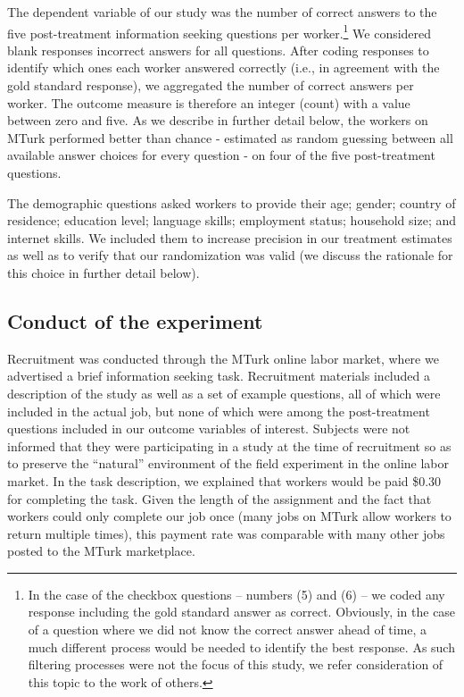 \documentclass{chi2009}
\begin{document}
{%
The dependent variable of our study was the number of correct answers
to the five post-treatment information seeking questions per
worker.\footnote{In the case of the checkbox questions -- numbers (5)
  and (6) -- we coded any response including the gold standard answer
  as correct. Obviously, in the case of a question where we did not
  know the correct answer ahead of time, a much different process
  would be needed to identify the best response. As such filtering
  processes were not the focus of this study, we refer consideration
  of this topic to the work of others.\cite{snow2008cheap}} We
considered blank responses incorrect answers for all questions. After
coding responses to identify which ones each worker answered correctly
(i.e., in agreement with the gold standard response), we aggregated
the number of correct answers per worker. The outcome measure is
therefore an integer (count) with a value between zero and five. As we
describe in further detail below, the workers on MTurk performed
better than chance - estimated as random guessing between all
available answer choices for every question - on four of the five
post-treatment questions.

The demographic questions asked workers to provide their age; gender;
country of residence; education level; language skills; employment
status; household size; and internet skills. We included them to
increase precision in our treatment estimates as well as to verify
that our randomization was valid (we discuss the rationale for this
choice in further detail below).

\subsection{Conduct of the experiment}

Recruitment was conducted through the MTurk online labor market, where
we advertised a brief information seeking task. Recruitment materials
included a description of the study as well as a set of example
questions, all of which were included in the actual job, but none of
which were among the post-treatment questions included in our outcome
variables of interest. Subjects were not informed that they were
participating in a study at the time of recruitment so as to preserve
the ``natural'' environment of the field experiment in the online
labor market. In the task description, we explained that workers would
be paid \$0.30 for completing the task. Given the length of the
assignment and the fact that workers could only complete our job once
(many jobs on MTurk allow workers to return multiple times), this
payment rate was comparable with many other jobs posted to the MTurk
marketplace.

}
\end{document}
